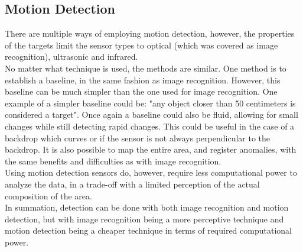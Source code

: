 \subsection{Motion Detection}
There are multiple ways of employing motion detection, however, the properties of the targets limit the sensor types to optical (which was covered as image recognition), ultrasonic and infrared. \\

No matter what technique is used, the methods are similar. One method is to establish a baseline, in the same fashion as image recognition. However, this baseline can be much simpler than the one used for image recognition. One example of a simpler baseline could be: "any object closer than 50 centimeters is considered a target". Once again a baseline could also be fluid, allowing for small changes while still detecting rapid changes. This could be useful in the case of a backdrop which curves or if the sensor is not always perpendicular to the backdrop. It is also possible to map the entire area, and register anomalies, with the same benefits and difficulties as with image recognition. \\

Using motion detection sensors do, however, require less computational power to analyze the data, in a trade-off with a limited perception of the actual composition of the area. \\

In summation, detection can be done with both image recognition and motion detection, but with image recognition being a more perceptive technique and motion detection being a cheaper technique in terms of required computational power.

